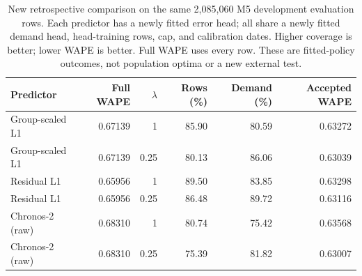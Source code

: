 \begin{table}[H]
\centering\small
\caption{New retrospective comparison on the same 2,085,060 M5 development evaluation rows. Each predictor has a newly fitted error head; all share a newly fitted demand head, head-training rows, cap, and calibration dates. Higher coverage is better; lower WAPE is better. Full WAPE uses every row. These are fitted-policy outcomes, not population optima or a new external test.}
\label{tab:accuracy-selection}
\begin{tabular}{lrrrrr}\toprule
Predictor & Full WAPE & $\lambda$ & Rows (\%) & Demand (\%) & Accepted WAPE\\\midrule
Group-scaled L1 & 0.67139 & 1 & 85.90 & 80.59 & 0.63272 \\
Group-scaled L1 & 0.67139 & 0.25 & 80.13 & 86.06 & 0.63039 \\
Residual L1 & 0.65956 & 1 & 89.50 & 83.85 & 0.63298 \\
Residual L1 & 0.65956 & 0.25 & 86.48 & 89.72 & 0.63116 \\
Chronos-2 (raw) & 0.68310 & 1 & 80.74 & 75.42 & 0.63568 \\
Chronos-2 (raw) & 0.68310 & 0.25 & 75.39 & 81.82 & 0.63007 \\
\bottomrule\end{tabular}
\end{table}
